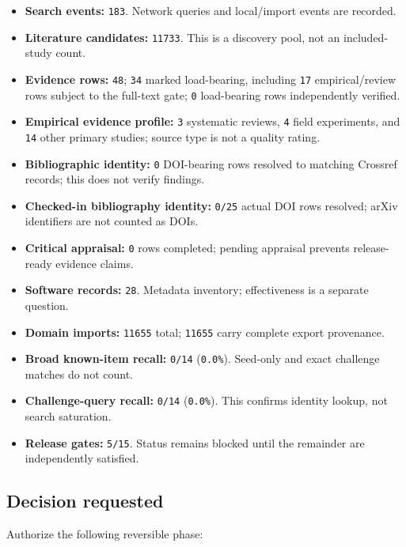 \documentclass[11pt]{article}
\providecommand{\tightlist}{\setlength{\itemsep}{0pt}\setlength{\parskip}{0pt}}
\begin{document}
\begin{itemize}
\tightlist
\item
  \textbf{Search events:} \texttt{183}. Network queries and local/import events are recorded.
\item
  \textbf{Literature candidates:} \texttt{11733}. This is a discovery pool, not an included-study count.
\item
  \textbf{Evidence rows:} \texttt{48}; \texttt{34} marked load-bearing, including \texttt{17} empirical/review rows subject to the full-text gate; \texttt{0} load-bearing rows independently verified.
\item
  \textbf{Empirical evidence profile:} \texttt{3} systematic reviews, \texttt{4} field experiments, and \texttt{14} other primary studies; source type is not a quality rating.
\item
  \textbf{Bibliographic identity:} \texttt{0} DOI-bearing rows resolved to matching Crossref records; this does not verify findings.
\item
  \textbf{Checked-in bibliography identity:} \texttt{0/25} actual DOI rows resolved; arXiv identifiers are not counted as DOIs.
\item
  \textbf{Critical appraisal:} \texttt{0} rows completed; pending appraisal prevents release-ready evidence claims.
\item
  \textbf{Software records:} \texttt{28}. Metadata inventory; effectiveness is a separate question.
\item
  \textbf{Domain imports:} \texttt{11655} total; \texttt{11655} carry complete export provenance.
\item
  \textbf{Broad known-item recall:} \texttt{0/14} (\texttt{0.0\%}). Seed-only and exact challenge matches do not count.
\item
  \textbf{Challenge-query recall:} \texttt{0/14} (\texttt{0.0\%}). This confirms identity lookup, not search saturation.
\item
  \textbf{Release gates:} \texttt{5/15}. Status remains blocked until the remainder are independently satisfied.
\end{itemize}

\hypertarget{decision-requested}{%
\subsection{Decision requested}\label{decision-requested}}

Authorize the following reversible phase:
\end{document}
